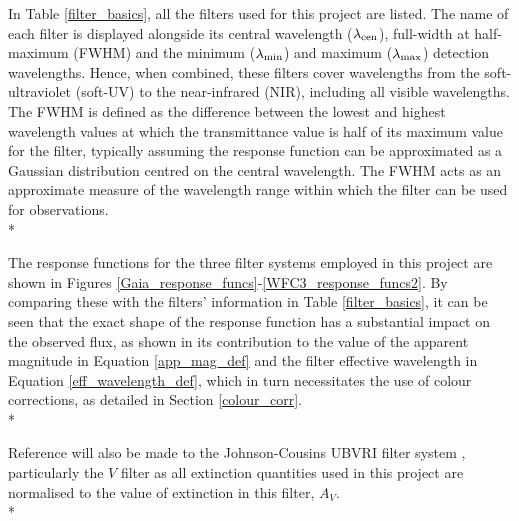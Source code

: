 \documentclass[12pt, a4paper]{report}
\begin{document}
In Table \ref{filter_basics}, all the filters used for this project are listed. The name of each filter is displayed alongside its central wavelength ($\lambda_{\textnormal{cen}}$), full-width at half-maximum (FWHM) and the minimum ($\lambda_{\textnormal{min}}$) and maximum ($\lambda_{\textnormal{max}}$) detection wavelengths. Hence, when combined, these filters cover wavelengths from the soft-ultraviolet (soft-UV) to the near-infrared (NIR), including all visible wavelengths. The FWHM is defined as the difference between the lowest and highest wavelength values at which the transmittance value is half of its maximum value for the filter, typically assuming the response function can be approximated as a Gaussian distribution centred on the central wavelength. The FWHM acts as an approximate measure of the wavelength range within which the filter can be used for observations.\\*

The response functions for the three filter systems employed in this project are shown in Figures \ref{Gaia_response_funcs}-\ref{WFC3_response_funcs2}. By comparing these with the filters' information in Table \ref{filter_basics}, it can be seen that the exact shape of the response function has a substantial impact on the observed flux, as shown in its contribution to the value of the apparent magnitude in Equation \ref{app_mag_def} and the filter effective wavelength in Equation \ref{eff_wavelength_def}, which in turn necessitates the use of colour corrections, as detailed in Section \ref{colour_corr}.\\*

Reference will also be made to the Johnson-Cousins UBVRI filter system \citep{1953ApJ...117..313J,1990PASP..102.1181B}, particularly the $V$ filter as all extinction quantities used in this project are normalised to the value of extinction in this filter, $A_{V}$. \\*
\end{document}
